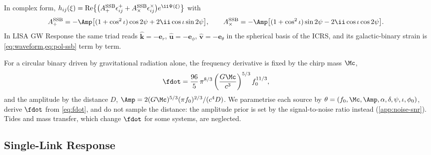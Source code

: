 In complex form, $h_{ij}(\xi) = \mathrm{Re}\bigl\{\bigl(A_+^{\rm SSB}\epsilon^+_{ij}
+ A_\times^{\rm SSB}\epsilon^\times_{ij}\bigr)e^{\ii\Psi(\xi)}\bigr\}$ with
\begin{equation}
  A_+^{\rm SSB} = -\Amp\bigl[(1+\cos^2\iota)\cos2\psi + 2\ii\cos\iota\sin2\psi\bigr],\qquad
  A_\times^{\rm SSB} = -\Amp\bigl[(1+\cos^2\iota)\sin2\psi - 2\ii\cos\iota\cos2\psi\bigr].
  \label{eq:complex-amp}
\end{equation}
In LISA GW Response the same triad reads $\hat{\mathbf k} = -\mathbf e_r$,
$\hat{\mathbf u} = -\mathbf e_\phi$, $\hat{\mathbf v} = -\mathbf e_\theta$ in the spherical basis
of the ICRS, and its galactic-binary strain is \cref{eq:waveform,eq:pol-ssb} term by term.

For a circular binary driven by gravitational radiation alone, the frequency derivative is
fixed by the chirp mass $\Mc$,
\begin{equation}
  \fdot = \frac{96}{5}\,\pi^{8/3}\left(\frac{G\Mc}{c^3}\right)^{5/3} f_0^{11/3},
  \label{eq:fdot}
\end{equation}
and the amplitude by the distance $D$, $\Amp = 2(G\Mc)^{5/3}(\pi f_0)^{2/3}/(c^4 D)$. We
parametrise each source by $\theta = (f_0, \Mc, \Amp, \alpha, \delta, \psi, \iota, \phi_0)$,
derive $\fdot$ from \cref{eq:fdot}, and do not sample the distance: the amplitude prior is
set by the signal-to-noise ratio instead (\cref{app:noise-snr}). Tides and mass transfer,
which change $\fdot$ for some systems, are neglected.

\subsection{Single-Link Response}
\label{app:signal-response}

